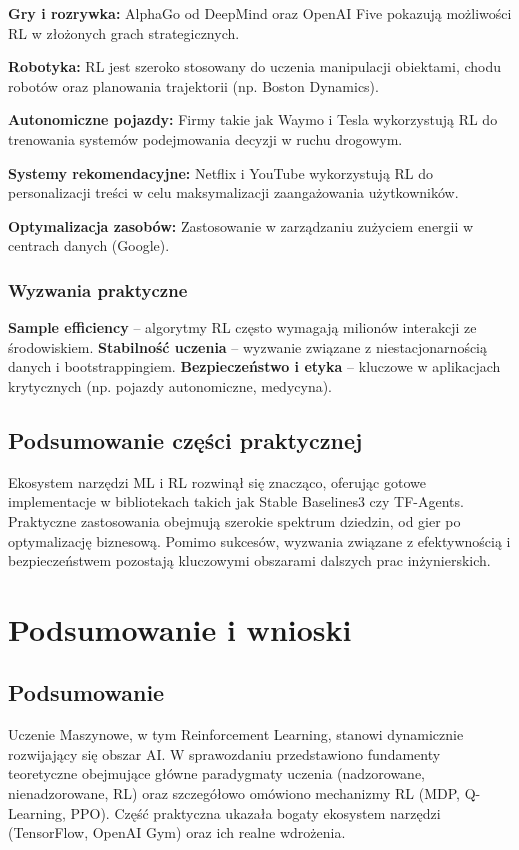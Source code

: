 \documentclass[12pt,a4paper]{article}
\begin{document}
\textbf{Gry i rozrywka:} AlphaGo od DeepMind oraz OpenAI Five pokazują możliwości RL w złożonych grach strategicznych.

\textbf{Robotyka:} RL jest szeroko stosowany do uczenia manipulacji obiektami, chodu robotów oraz planowania trajektorii (np. Boston Dynamics).

\textbf{Autonomiczne pojazdy:} Firmy takie jak Waymo i Tesla wykorzystują RL do trenowania systemów podejmowania decyzji w ruchu drogowym.

\textbf{Systemy rekomendacyjne:} Netflix i YouTube wykorzystują RL do personalizacji treści w celu maksymalizacji zaangażowania użytkowników.

\textbf{Optymalizacja zasobów:} Zastosowanie w zarządzaniu zużyciem energii w centrach danych (Google).

\subsubsection{Wyzwania praktyczne}

\textbf{Sample efficiency} -- algorytmy RL często wymagają milionów interakcji ze środowiskiem.
\textbf{Stabilność uczenia} -- wyzwanie związane z niestacjonarnością danych i bootstrappingiem.
\textbf{Bezpieczeństwo i etyka} -- kluczowe w aplikacjach krytycznych (np. pojazdy autonomiczne, medycyna).

\subsection{Podsumowanie części praktycznej}

Ekosystem narzędzi ML i RL rozwinął się znacząco, oferując gotowe implementacje w bibliotekach takich jak Stable Baselines3 czy TF-Agents. Praktyczne zastosowania obejmują szerokie spektrum dziedzin, od gier po optymalizację biznesową. Pomimo sukcesów, wyzwania związane z efektywnością i bezpieczeństwem pozostają kluczowymi obszarami dalszych prac inżynierskich.

\newpage

\section{Podsumowanie i wnioski}

\subsection{Podsumowanie}

Uczenie Maszynowe, w tym Reinforcement Learning, stanowi dynamicznie rozwijający się obszar AI. W sprawozdaniu przedstawiono fundamenty teoretyczne obejmujące główne paradygmaty uczenia (nadzorowane, nienadzorowane, RL) oraz szczegółowo omówiono mechanizmy RL (MDP, Q-Learning, PPO). Część praktyczna ukazała bogaty ekosystem narzędzi (TensorFlow, OpenAI Gym) oraz ich realne wdrożenia.
\end{document}
